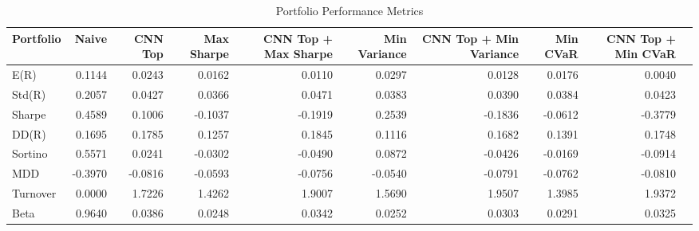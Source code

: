 \begin{table}[htbp]
\centering
\caption{Portfolio Performance Metrics}
\begin{tabular}{lrrrrrrrrr}
\hline
Portfolio & Naive & CNN Top & Max Sharpe & CNN Top + Max Sharpe & Min Variance & CNN Top + Min Variance & Min CVaR & CNN Top + Min CVaR \\
\hline
E(R) & 0.1144 & 0.0243 & 0.0162 & 0.0110 & 0.0297 & 0.0128 & 0.0176 & 0.0040 \\
Std(R) & 0.2057 & 0.0427 & 0.0366 & 0.0471 & 0.0383 & 0.0390 & 0.0384 & 0.0423 \\
Sharpe & 0.4589 & 0.1006 & -0.1037 & -0.1919 & 0.2539 & -0.1836 & -0.0612 & -0.3779 \\
DD(R) & 0.1695 & 0.1785 & 0.1257 & 0.1845 & 0.1116 & 0.1682 & 0.1391 & 0.1748 \\
Sortino & 0.5571 & 0.0241 & -0.0302 & -0.0490 & 0.0872 & -0.0426 & -0.0169 & -0.0914 \\
MDD & -0.3970 & -0.0816 & -0.0593 & -0.0756 & -0.0540 & -0.0791 & -0.0762 & -0.0810 \\
Turnover & 0.0000 & 1.7226 & 1.4262 & 1.9007 & 1.5690 & 1.9507 & 1.3985 & 1.9372 \\
Beta & 0.9640 & 0.0386 & 0.0248 & 0.0342 & 0.0252 & 0.0303 & 0.0291 & 0.0325 \\
\hline
\end{tabular}
\end{table}